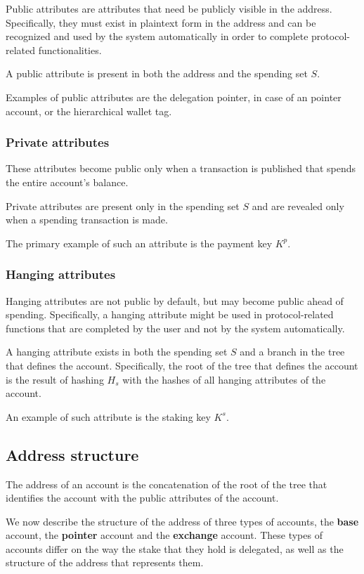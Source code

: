 Public attributes are attributes that need be publicly visible in the address. Specifically, they must exist in plaintext form in the address and can be recognized and used by the system automatically in order to complete protocol-related functionalities.

A public attribute is present in both the address and the spending set $S$.

Examples of public attributes are the delegation pointer, in case of an pointer account, or the hierarchical wallet tag.

\subsubsection{Private attributes}

These attributes become public only when a transaction is published that spends the entire account's balance.

Private attributes are present only in the spending set $S$ and are revealed only when a spending transaction is made.

The primary example of such an attribute is the payment key $K^p$.

\subsubsection{Hanging attributes}

Hanging attributes are not public by default, but may become public ahead of spending. Specifically, a hanging attribute might be used in protocol-related functions that are completed by the user and not by the system automatically.

A hanging attribute exists in both the spending set $S$ and a branch in the tree that defines the account. Specifically, the root of the tree that defines the account is the result of hashing $H_s$ with the hashes of all hanging attributes of the account.

An example of such attribute is the staking key $K^s$.

\subsection{Address structure}

The address of an account is the concatenation of the root of the tree that identifies the account with the public attributes of the account.

We now describe the structure of the address of three types of accounts, the \textbf{base} account, the \textbf{pointer} account and the \textbf{exchange} account. These types of accounts differ on the way the stake that they hold is delegated, as well as the structure of the address that represents them.

